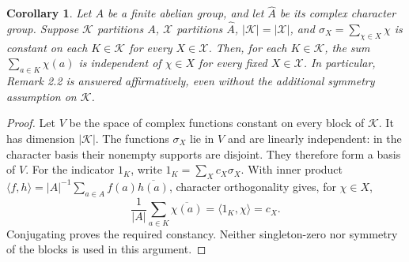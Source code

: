 \documentclass[10pt]{article}
\newtheorem{corollary}{Corollary}
\begin{document}
\begin{corollary}\label{cor:duality}
Let $A$ be a finite abelian group, and let $\widehat A$ be its
complex character group. Suppose $\mathcal K$ partitions $A$,
$\mathcal X$ partitions $\widehat A$, $|\mathcal K|=|\mathcal X|$,
and $\sigma_X=\sum_{\chi\in X}\chi$ is constant on each
$K\in\mathcal K$ for every $X\in\mathcal X$.
Then, for each $K\in\mathcal K$, the sum $\sum_{a\in K}\chi(a)$
is independent of $\chi\in X$ for every fixed $X\in\mathcal X$.
In particular, Remark 2.2 is answered affirmatively, even without
the additional symmetry assumption on $\mathcal K$.
\end{corollary}
\begin{proof}
Let $V$ be the space of complex functions constant on every block
of $\mathcal K$. It has dimension $|\mathcal K|$.
The functions $\sigma_X$ lie in $V$ and are linearly independent:
in the character basis their nonempty supports are disjoint.
They therefore form a basis of $V$. For the indicator $1_K$,
write $1_K=\sum_X c_X\sigma_X$.
With inner product
$\langle f,h\rangle=|A|^{-1}\sum_{a\in A}f(a)\overline{h(a)}$,
character orthogonality gives, for $\chi\in X$,
\[
 \frac1{|A|}\sum_{a\in K}\overline{\chi(a)}
 =\langle1_K,\chi\rangle=c_X.
\]
Conjugating proves the required constancy. Neither singleton-zero
nor symmetry of the blocks is used in this argument.
\end{proof}
\end{document}
